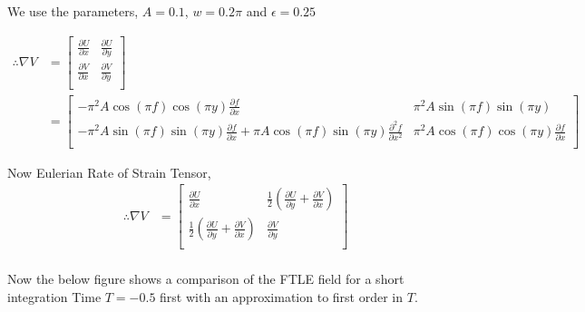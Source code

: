 \documentclass[../report.tex]{subfiles}
\begin{document}
We use the parameters, \(A = 0.1\), \(w = 0.2\pi\) and \(\epsilon = 0.25\)

\begin{equation}
  \begin{aligned}
    \therefore \nabla V &= \begin{bmatrix}
      \frac{\partial U}{\partial x} & \frac{\partial U}{\partial y} \\[12pt]
      \frac{\partial V}{\partial x} & \frac{\partial V}{\partial y} \\
    \end{bmatrix} \\
    &= \begin{bmatrix}
      -\pi^2 A\cos(\pi f)\cos(\pi y) \frac{\partial f}{\partial x} & \pi^2 A\sin(\pi f)\sin(\pi y) \\[12pt]
      -\pi^2 A\sin(\pi f)\sin(\pi y)\frac{\partial f}{\partial x} + \pi A\cos(\pi f)\sin(\pi y) \frac{\partial^2 f}{\partial x^2} & \pi^2 A\cos(\pi f)\cos(\pi y)\frac{\partial f}{\partial x} \\
    \end{bmatrix}
  \end{aligned}
\end{equation}

Now Eulerian Rate of Strain Tensor,
\begin{equation}
  \begin{aligned}
    \therefore \nabla V &= \begin{bmatrix}
      \frac{\partial U}{\partial x} & \frac{1}{2} (\frac{\partial U}{\partial y} + \frac{\partial V}{\partial x}) \\[12pt]
      \frac{1}{2} (\frac{\partial U}{\partial y} + \frac{\partial V}{\partial x}) & \frac{\partial V}{\partial y} \\
    \end{bmatrix} \\
  \end{aligned}
\end{equation}

Now the below figure shows a comparison of the FTLE field for a short integration Time \(T = -0.5\) first with an approximation to first order in \(T\).
\end{document}

